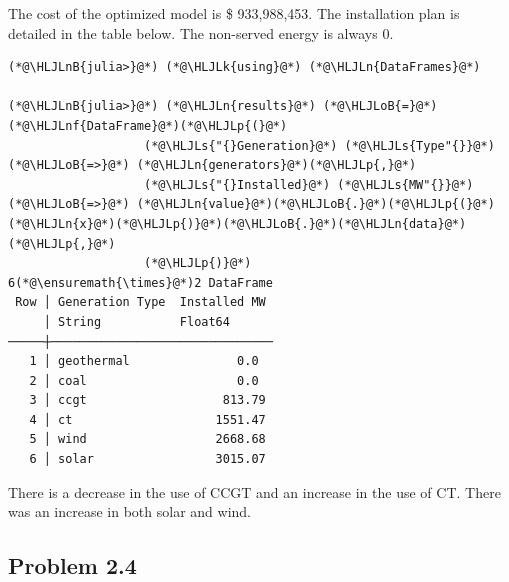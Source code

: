 \documentclass[12pt,a4paper]{article}
\newcommand{\HLJLk}[1]{\textcolor[RGB]{148,91,176}{\textbf{#1}}}
\newcommand{\HLJLn}[1]{#1}
\newcommand{\HLJLnf}[1]{\textcolor[RGB]{66,102,213}{#1}}
\newcommand{\HLJLs}[1]{\textcolor[RGB]{201,61,57}{#1}}
\newcommand{\HLJLnB}[1]{\textcolor[RGB]{59,151,46}{#1}}
\newcommand{\HLJLoB}[1]{\textcolor[RGB]{102,102,102}{\textbf{#1}}}
\newcommand{\HLJLp}[1]{#1}
\begin{document}
The cost of the optimized model is \$ 933,988,453. The installation plan is detailed in the table below. The non-served energy is always 0.


\begin{lstlisting}
(*@\HLJLnB{julia>}@*) (*@\HLJLk{using}@*) (*@\HLJLn{DataFrames}@*)

(*@\HLJLnB{julia>}@*) (*@\HLJLn{results}@*) (*@\HLJLoB{=}@*) (*@\HLJLnf{DataFrame}@*)(*@\HLJLp{(}@*)
                   (*@\HLJLs{"{}Generation}@*) (*@\HLJLs{Type"{}}@*)        (*@\HLJLoB{=>}@*) (*@\HLJLn{generators}@*)(*@\HLJLp{,}@*)
                   (*@\HLJLs{"{}Installed}@*) (*@\HLJLs{MW"{}}@*)  (*@\HLJLoB{=>}@*) (*@\HLJLn{value}@*)(*@\HLJLoB{.}@*)(*@\HLJLp{(}@*)(*@\HLJLn{x}@*)(*@\HLJLp{)}@*)(*@\HLJLoB{.}@*)(*@\HLJLn{data}@*)(*@\HLJLp{,}@*)
                   (*@\HLJLp{)}@*)
6(*@\ensuremath{\times}@*)2 DataFrame
 Row │ Generation Type  Installed MW
     │ String           Float64
─────┼───────────────────────────────
   1 │ geothermal               0.0
   2 │ coal                     0.0
   3 │ ccgt                   813.79
   4 │ ct                    1551.47
   5 │ wind                  2668.68
   6 │ solar                 3015.07
\end{lstlisting}

There is a decrease in the use of CCGT and an increase in the use of CT. There was an increase in both  solar and wind.

\subsection{Problem 2.4}
\end{document}
